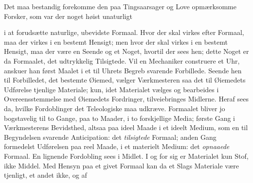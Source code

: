 \documentclass[12pt,a4paper]{book}
\begin{document}

Det maa bestandig forekomme den paa Tingsaarsager og Love opmærksomme
Forsker, som var der noget høist unaturligt

i at forudsætte naturlige, ubevidste Formaal. Hvor der skal virkes efter
Formaal, maa der virkes i en bestemt Hensigt; men hvor der skal virkes i
en bestemt Hensigt, maa der være en Seende og et Noget, hvortil der sees
hen; dette Noget er da Formaalet, det udtrykkelig Tilsigtede. Vil en
Mechaniker construere et Uhr, anskuer han først Maalet i et til Uhrets
Begreb svarende Forbillede. Seende hen til Forbilledet, det bestemte
Øiemed, vælger Værkmesteren saa det til Øiemedets Udførelse tjenlige
Materiale; kun, idet Materialet vælges og bearbeides i Overeensstemmelse
med Øiemedets Fordringer, tilveiebringes Midlerne. Heraf sees da, hvilke
Fordoblinger det Teleologiske maa udkræve. Formaalet bliver jo bogstavelig
til to Gange, paa to Maader, i to forskjellige Media; første Gang i
Værkmesterens Bevidsthed, altsaa paa ideel Maade i et ideelt Medium, som
en til Begyndelsen svarende Anticipation: det \emph{tilsigtede} Formaal;
anden Gang formedelst Udførelsen paa reel Maade, i et materielt Medium:
det \emph{opnaaede} Formaal. En lignende Fordobling sees i Midlet. I og
for sig er Materialet kun Stof, ikke Middel. Med Hensyn paa et givet
Formaal kan da et Slags Materiale være tjenligt, et andet ikke, og af
\end{document}
